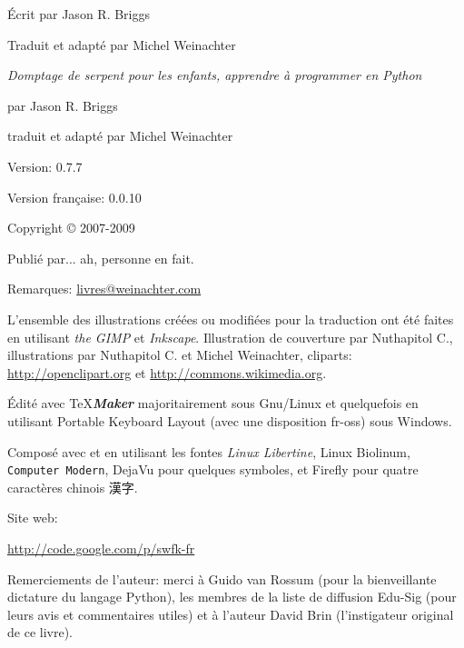 \begin{flushright}
\textcolor{bleu}{\begin{Huge}\textsf{Écrit par Jason R. Briggs}\end{Huge}}

\textcolor{bleu}{\begin{huge}\textsf{Traduit et adapté par Michel Weinachter}\end{huge}}
\end{flushright}

\newpage

\textit{Domptage de serpent pour les enfants, apprendre à programmer en Python}

par Jason R. Briggs

traduit et adapté par Michel Weinachter

\bigskip
Version: 0.7.7

Version française: 0.0.10

\bigskip
Copyright © 2007-2009

\bigskip
Publié par... ah, personne en fait.

\bigskip
Remarques: \href{mailto:livres@weinachter.com?subject=Domptage de serpents pour les enfants}{livres@weinachter.com}

\bigskip
L'ensemble des illustrations créées ou modifiées pour la traduction ont été faites en utilisant \emph{the GIMP} et \emph{Inkscape}.
Illustration de couverture par Nuthapitol C., illustrations par Nuthapitol C. et Michel Weinachter, cliparts:
\url{http://openclipart.org} et \url{http://commons.wikimedia.org}. 

\bigskip
Édité avec \TeX{}{\textbf{\emph{Maker}}} majoritairement sous Gnu/Linux et quelquefois en utilisant Portable Keyboard Layout (avec une disposition fr-oss) sous Windows.
 
Composé avec \XeTeX{} et \XeLaTeX{} en utilisant les fontes \emph{Linux Libertine}, \textsf{Linux Biolinum}, \texttt{Computer Modern}, \setsansfont[Mapping=tex-text]{DejaVu Sans}\textsf{DejaVu} pour quelques symboles, et Firefly pour quatre caractères chinois {漢字}.%
 
\bigskip
Site web:

\url{http://code.google.com/p/swfk-fr}

\bigskip
Remerciements de l'auteur: merci à Guido van Rossum (pour la bienveillante dictature du langage Python), les membres de la liste de diffusion Edu-Sig (pour leurs avis et commentaires utiles) et à l'auteur David Brin (l'instigateur original de ce livre).

